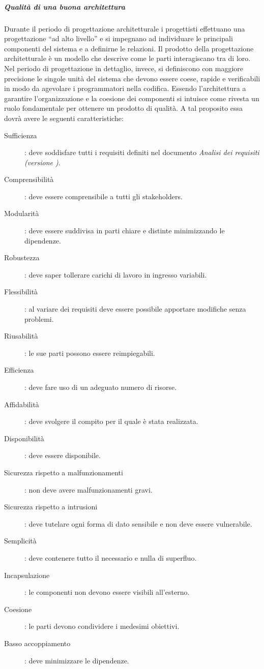 \documentclass[../../norme-di-progetto.tex]{subfiles}
\begin{document}
\subparagraph{Qualità di una buona architettura}%
\label{subp:qualita_di_una_buona_architettura}
Durante il periodo di progettazione architetturale i progettisti effettuano una progettazione ``ad alto livello'' e si impegnano ad individuare le principali componenti del sistema e a definirne le relazioni.
Il prodotto della progettazione architetturale è un modello che descrive come le parti interagiscano tra di loro.
Nel periodo di progettazione in dettaglio, invece, si definiscono con maggiore precisione le singole unità del sistema che devono essere coese, rapide e verificabili in modo da agevolare i programmatori nella codifica.
Essendo l'architettura a garantire l'organizzazione e la coesione dei componenti si intuisce come rivesta un ruolo fondamentale per ottenere un prodotto di qualità.
A tal proposito essa dovrà avere le seguenti caratteristiche:
\begin{description}
  \item [Sufficienza]: deve soddisfare tutti i requisiti definiti nel documento \textit{Analisi dei requisiti (versione \versione)}.
  \item [Comprensibilità]: deve essere comprensibile a tutti gli stakeholders.
  \item [Modularità]: deve essere suddivisa in parti chiare e distinte minimizzando le dipendenze.
  \item [Robustezza]: deve saper tollerare carichi di lavoro in ingresso variabili.
  \item [Flessibilità]: al variare dei requisiti deve essere possibile apportare modifiche senza problemi.
  \item [Riusabilità]: le sue parti possono essere reimpiegabili.
  \item [Efficienza]: deve fare uso di un adeguato numero di risorse.
  \item [Affidabilità]: deve svolgere il compito per il quale è stata realizzata.
  \item [Disponibilità]: deve essere disponibile.
  \item [Sicurezza rispetto a malfunzionamenti]: non deve avere malfunzionamenti gravi.
  \item [Sicurezza rispetto a intrusioni]: deve tutelare ogni forma di dato sensibile e non deve essere vulnerabile.
  \item [Semplicità]: deve contenere tutto il necessario e nulla di superfluo.
  \item [Incapsulazione]: le componenti non devono essere visibili all'esterno.
  \item [Coesione]: le parti devono condividere i medesimi obiettivi.
  \item [Basso accoppiamento]: deve minimizzare le dipendenze.
\end{description}
\end{document}
